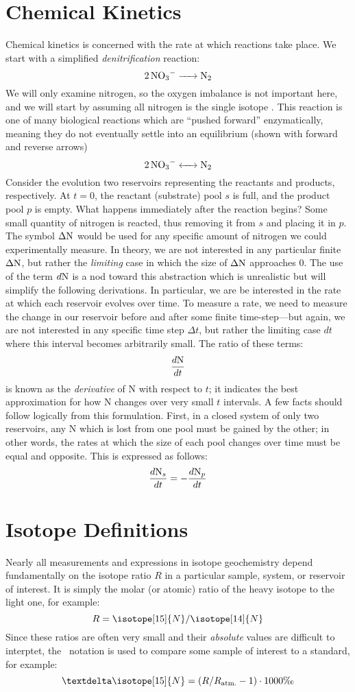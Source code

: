 \section{Chemical Kinetics}
Chemical kinetics is concerned with the rate at which reactions take place. We start with a simplified \emph{denitrification} reaction:
\[\ce{2NO3- -> N2}\]
We will only examine nitrogen, so the oxygen imbalance is not important here, and we will start by assuming all nitrogen is the single isotope . This reaction is one of many biological reactions which are ``pushed forward'' enzymatically, meaning they do not eventually settle into an equilibrium (shown with forward and reverse arrows)
\[\ce{2NO3- <-> N2}\]
Consider the evolution two reservoirs representing the reactants and products, respectively. At $t=0$, the reactant (substrate) pool $s$ is full, and the product pool $p$ is empty. What happens immediately after the reaction begins? Some small quantity of nitrogen is reacted, thus removing it from $s$ and placing it in $p$. The symbol $\Delta\ce{N}$ would be used for any specific amount of nitrogen we could experimentally measure. In theory, we are not interested in any particular finite $\Delta\ce{N}$, but rather the \emph{limiting} case in which the size of $\Delta\ce{N}$ approaches 0. The use of the term $d\ce{N}$ is a nod toward this abstraction which is unrealistic but will simplify the following derivations. In particular, we are be interested in the rate at which each reservoir evolves over time. To measure a rate, we need to measure the change in our reservoir before and after some finite time-step---but again, we are not interested in any specific time step $\Delta t$, but rather the limiting case $dt$ where this interval becomes arbitrarily small. The ratio of these terms:
\[\frac{d\ce{N}}{dt}\]
is known as the \emph{derivative} of N with respect to $t$; it indicates the best approximation for how N changes over very small $t$ intervals. A few facts should follow logically from this formulation. First, in a closed system of only two reservoirs, any N which is lost from one pool must be gained by the other; in other words, the rates at which the size of each pool changes over time must be equal and opposite. This is expressed as follows:
\[\frac{d\ce{N_s}}{dt}=-\frac{d\ce{N_p}}{dt}\]

\section{Isotope Definitions}
Nearly all measurements and expressions in isotope geochemistry depend fundamentally on the isotope ratio $R$ in a particular sample, system, or reservoir of interest. It is simply the molar (or atomic) ratio of the heavy isotope to the light one, for example:
\[R=\isotope[15]{N}/\isotope[14]{N}\]
Since these ratios are often very small and their \emph{absolute} values are difficult to interptet, the \textdelta\ notation is used to compare some sample of interest to a standard, for example:
\[\text{\textdelta}\isotope[15]{N}=(R/R_\text{atm.}-1)\cdot1000 \text{\textperthousand}\]

